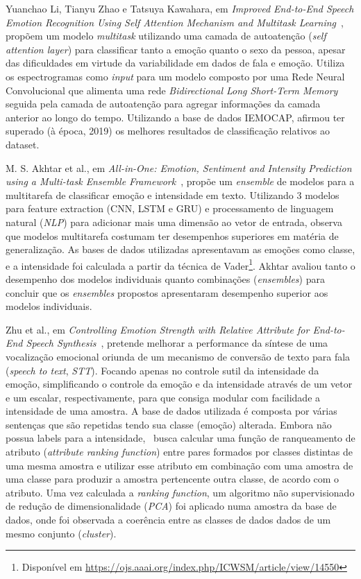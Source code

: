 Yuanchao Li, Tianyu Zhao e Tatsuya Kawahara, em \textit{Improved End-to-End Speech Emotion Recognition Using Self Attention Mechanism and Multitask Learning}~\cite{32.95}, propõem um modelo \textit{multitask} utilizando uma camada de autoatenção (\textit{self attention layer}) para classificar tanto a emoção quanto o sexo da pessoa, apesar das dificuldades em virtude da variabilidade em dados de fala e emoção. Utiliza os espectrogramas como \textit{input} para um modelo composto por uma Rede Neural Convolucional que alimenta uma rede \textit{Bidirectional Long Short-Term Memory} seguida pela camada de autoatenção para agregar informações da camada anterior ao longo do tempo. Utilizando a base de dados IEMOCAP, afirmou ter superado (à época, 2019) os melhores resultados de classificação relativos ao dataset.

M. S. Akhtar et al., em \textit{All-in-One: Emotion, Sentiment and Intensity Prediction using a Multi-task Ensemble Framework}~\cite{28}, propõe um \textit{ensemble} de modelos para a multitarefa de classificar emoção e intensidade em texto. Utilizando 3 modelos para feature extraction (\acrshort{CNN}, \acrlong{LSTM} e \acrshort{GRU}) e processamento de linguagem natural (\textit{NLP}) para adicionar mais uma dimensão ao vetor de entrada, observa que modelos multitarefa
 costumam ter desempenhos superiores em matéria de generalização. As bases de dados utilizadas apresentavam as emoções como classe, e a intensidade foi calculada a partir da técnica de Vader\footnote{Disponível em \url{https://ojs.aaai.org/index.php/ICWSM/article/view/14550}}. Akhtar avaliou tanto o desempenho dos modelos individuais quanto combinações (\textit{ensembles}) para concluir que os \textit{ensembles} propostos apresentaram desempenho superior aos modelos individuais.

Zhu et al., em \textit{Controlling Emotion Strength with Relative Attribute for End-to-End Speech Synthesis}~\cite{63}, pretende melhorar a performance da síntese de uma vocalização emocional oriunda de um mecanismo de conversão de texto para fala (\textit{speech to text}, \textit{STT}). Focando apenas no controle sutil da intensidade da emoção, simplificando o controle da emoção e da intensidade através de um vetor e um escalar, respectivamente, para que consiga modular com facilidade a intensidade de uma amostra. A base de dados utilizada é composta por várias sentenças que são repetidas tendo sua classe (emoção) alterada. Embora não possua labels para a intensidade,~\cite{63} busca calcular uma função de ranqueamento de atributo (\textit{attribute ranking function}) entre pares formados por classes distintas de uma mesma amostra e utilizar esse atributo em combinação com uma amostra de uma classe para produzir a amostra pertencente outra classe, de acordo com o atributo. Uma vez calculada a \textit{ranking function}, um algoritmo não supervisionado de redução de dimensionalidade (\textit{PCA}) foi aplicado numa amostra da base de dados, onde foi observada a coerência entre as classes de dados dados de um mesmo conjunto (\textit{cluster}).

